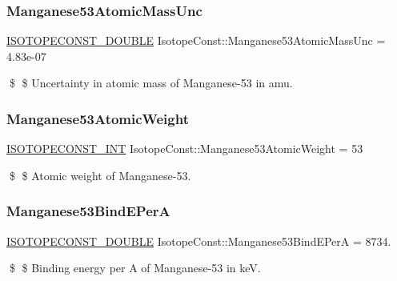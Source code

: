 \subsubsection{\texorpdfstring{Manganese53\+Atomic\+Mass\+Unc}{Manganese53AtomicMassUnc}}
{\footnotesize\ttfamily \mbox{\hyperlink{group___isotope_const-_macros_ga8f45a7272ce02c0b4c65c44636ed719a}{I\+S\+O\+T\+O\+P\+E\+C\+O\+N\+S\+T\+\_\+\+D\+O\+U\+B\+LE}} Isotope\+Const\+::\+Manganese53\+Atomic\+Mass\+Unc = 4.\+83e-\/07}

\$ \$ Uncertainty in atomic mass of Manganese-\/53 in amu. \mbox{\label{group___isotope_const-_manganese-_mn53_ga3c3a47f01df1acdd0a38b63346dbdff5}} 
\subsubsection{\texorpdfstring{Manganese53\+Atomic\+Weight}{Manganese53AtomicWeight}}
{\footnotesize\ttfamily \mbox{\hyperlink{group___isotope_const-_macros_ga5f18360b3e99483a35c32d789e62621c}{I\+S\+O\+T\+O\+P\+E\+C\+O\+N\+S\+T\+\_\+\+I\+NT}} Isotope\+Const\+::\+Manganese53\+Atomic\+Weight = 53}

\$ \$ Atomic weight of Manganese-\/53. \mbox{\label{group___isotope_const-_manganese-_mn53_gae5803c552f37eff89f8eb90205f427aa}} 
\subsubsection{\texorpdfstring{Manganese53\+Bind\+E\+PerA}{Manganese53BindEPerA}}
{\footnotesize\ttfamily \mbox{\hyperlink{group___isotope_const-_macros_ga8f45a7272ce02c0b4c65c44636ed719a}{I\+S\+O\+T\+O\+P\+E\+C\+O\+N\+S\+T\+\_\+\+D\+O\+U\+B\+LE}} Isotope\+Const\+::\+Manganese53\+Bind\+E\+PerA = 8734.}

\$ \$ Binding energy per A of Manganese-\/53 in keV. \mbox{\label{group___isotope_const-_manganese-_mn53_ga0c2db3c6ce0b06fa836f1487d7df5e12}} 
